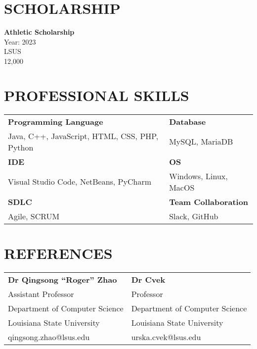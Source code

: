 \documentclass[a4paper,9pt]{article}
\begin{document}

\section*{SCHOLARSHIP}

\noindent
\textbf{Athletic Scholarship} \\
Year: 2023 \\
LSUS \\
12,000

\section*{PROFESSIONAL SKILLS}

\noindent
\begin{tabular}{|p{}|p{}|}
\hline
\textbf{Programming Language} & \textbf{Database} \\
Java, C++, JavaScript, HTML, CSS, PHP, Python & MySQL, MariaDB \\
\hline
\textbf{IDE} & \textbf{OS} \\
Visual Studio Code, NetBeans, PyCharm & Windows, Linux, MacOS \\
\hline
\textbf{SDLC} & \textbf{Team Collaboration} \\
Agile, SCRUM & Slack, GitHub \\
\hline
\end{tabular}

\section*{REFERENCES}

\noindent
\begin{tabular}{|p{}|p{}|}
\hline
\textbf{Dr Qingsong “Roger” Zhao} & \textbf{Dr Cvek} \\
Assistant Professor & Professor \\
Department of Computer Science & Department of Computer Science \\
Louisiana State University & Louisiana State University \\
qingsong.zhao@lsus.edu & urska.cvek@lsus.edu \\
\hline
\end{tabular}
\end{document}
